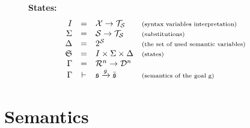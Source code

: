 \documentclass{llncs}
\newcommand{\supp}[1]{\scriptsize{#1}}
\begin{document}
\begin{figure}
{\bf States:}
$$
\begin{array}{rcll}
  I &=& \mathcal{X} \rightarrow \mathcal{T_S} & \mbox{\supp(syntax variables interpretation)} \\
  \Sigma &=& \mathcal{S} \rightarrow \mathcal{T_S} & \mbox{\supp(substitutions)} \\
  \Delta &=& 2^\mathcal{S} & \mbox{\supp(the set of used semantic variables)} \\
  \mathfrak{S} &=& I \times \Sigma \times \Delta & \mbox{\supp(states)} \\
  \Gamma &=& \mathcal{R}^n \rightarrow \mathcal{D}^n & \\
  \Gamma &\vdash& \mathfrak{s} \xrightarrow{g} \mathfrak{\bar{s}} & \mbox{\supp(semantics of the goal g)}
\end{array} 
$$

\end{figure}

\newpage
\section{Semantics}
\end{document}
